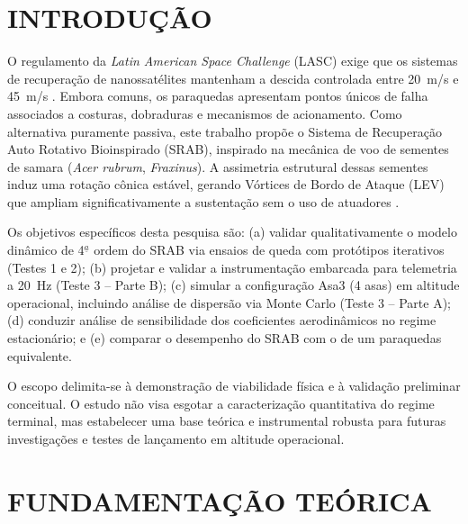 
\section{INTRODUÇÃO}

O regulamento da \textit{Latin American Space Challenge} (LASC) exige que os sistemas de recuperação de nanossatélites mantenham a descida controlada entre 20~m/s e 45~m/s \citep{lasc2026}. Embora comuns, os paraquedas apresentam pontos únicos de falha associados a costuras, dobraduras e mecanismos de acionamento. Como alternativa puramente passiva, este trabalho propõe o Sistema de Recuperação Auto Rotativo Bioinspirado (SRAB), inspirado na mecânica de voo de sementes de samara (\textit{Acer rubrum}, \textit{Fraxinus}). A assimetria estrutural dessas sementes induz uma rotação cônica estável, gerando Vórtices de Bordo de Ataque (LEV) que ampliam significativamente a sustentação sem o uso de atuadores \citep{lentink2009, mcconnell2023}.

Os objetivos específicos desta pesquisa são: (a) validar qualitativamente o modelo dinâmico de 4$^{\underline{a}}$ ordem do SRAB via ensaios de queda com protótipos iterativos (Testes 1 e 2); (b) projetar e validar a instrumentação embarcada para telemetria a 20~Hz (Teste 3 -- Parte B); (c) simular a configuração Asa3 (4 asas) em altitude operacional, incluindo análise de dispersão via Monte Carlo (Teste 3 -- Parte A); (d) conduzir análise de sensibilidade dos coeficientes aerodinâmicos no regime estacionário; e (e) comparar o desempenho do SRAB com o de um paraquedas equivalente.

O escopo delimita-se à demonstração de viabilidade física e à validação preliminar conceitual. O estudo não visa esgotar a caracterização quantitativa do regime terminal, mas estabelecer uma base teórica e instrumental robusta para futuras investigações e testes de lançamento em altitude operacional.


\section{FUNDAMENTAÇÃO TEÓRICA}

